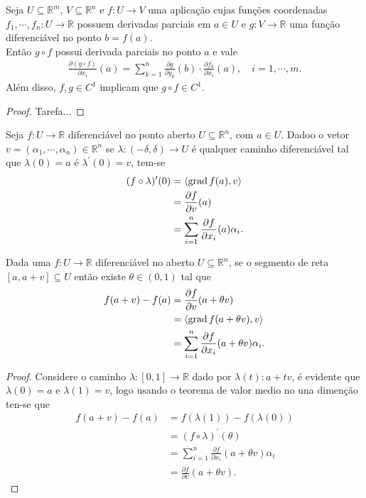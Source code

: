 \newpage
\begin{theorem}
  Seja $U\subseteq \mathbb{R}^{m}$, $V\subseteq\mathbb{R}^{n}$ e $f:U\to V$ uma aplicação cujas funções coordenadas $f_1,\cdots,f_n:U\to \mathbb{R}$ possuem derivadas parciais em $a\in U$ e $g:V\to\mathbb{R}$ uma função diferenciável no ponto $b=f(a)$.\\
  Então $g\circ f$ possui derivada parciais no ponto $a$ e vale
  \begin{align*}
    \frac{\partial (g\circ f)}{\partial x_i}(a)=\sum_{k=1}^{n}\frac{\partial g}{\partial y_k}(b)\cdot\frac{\partial f_k}{\partial x_i}(a),\quad i=1,\cdots,m.
  \end{align*}
  Além disso, $f,g\in C^1$ implicam que $g\circ f\in C^1$. 
\end{theorem}
\begin{proof}
  Tarefa...
\end{proof}
\begin{corollary}
  Seja $f:U\to \mathbb{R}$ diferenciável no ponto aberto $U\subseteq \mathbb{R}^{n}$, com $a\in U$. Dadoo o vetor $v=(\alpha_1,\cdots,\alpha_n)\in\mathbb{R}^{n}$ se $\lambda:(-\delta,\delta)\to U$ é qualquer caminho diferenciável tal que $\lambda(0)=a$ é $\lambda^{\prime}(0)=v$, tem-se
  \begin{align*}
    (f\circ \lambda)^{\prime}(0)&=\langle \operatorname{grad} f(a),v\rangle\\
    &=\frac{\partial f}{\partial v}(a)\\
    &=\sum_{i=1}^{n}\frac{\partial f}{\partial x_i}(a)\alpha_i.
  \end{align*}
\end{corollary}
\begin{corollary}[T.V.M]
  Dada uma $f:U\to\mathbb{R}$ diferenciável no aberto $U\subseteq \mathbb{R}^{n}$, se o segmento de reta $[a,a+v]\subseteq U$ então existe $\theta\in(0,1)$ tal que
  \begin{align*}
    f(a+v)-f(a)&=\frac{\partial f}{\partial v}(a+\theta v)\\
    &=\langle \operatorname{grad} f(a+\theta v),v \rangle\\
    &=\sum_{i=1}^{n}\frac{\partial f}{\partial x_i}(a+\theta v)\alpha_i.
  \end{align*} 
\end{corollary}
\begin{proof} 
  Considere o caminho $\lambda:[0,1]\to\mathbb{R}$ dado por $\lambda(t):a+tv$, é evidente que $\lambda(0)=a$ e $\lambda(1)=v$, logo usando o teorema de valor medio no una dimenção ten-se que
  \begin{align*}
    f(a+v)-f(a)&=f(\lambda(1))-f(\lambda(0))\\
    &=(f\circ \lambda)^{\prime}(\theta)\\
    &=\sum_{i=1}^{n}\frac{\partial f}{\partial x_i}(a+\theta v)\alpha_i\\
    &=\frac{\partial f}{\partial v}(a+\theta v).
  \end{align*}
\end{proof}
